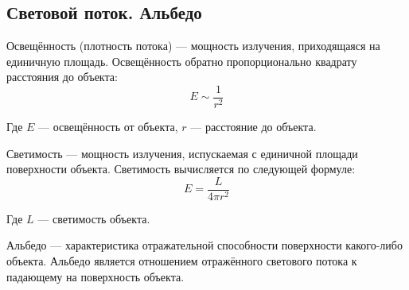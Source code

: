 \subsection{Световой поток. Альбедо}
Освещённость (плотность потока) --- мощность излучения, приходящаяся на единичную площадь. Освещённость обратно пропорционально квадрату расстояния до объекта:
\begin{equation}
E\sim \frac{1}{r^2}
\end{equation}

Где $E$ --- освещённость от объекта, $r$ --- расстояние до объекта.

Светимость --- мощность излучения, испускаемая с единичной площади поверхности объекта. Светимость вычисляется по следующей формуле:
\begin{equation}
E=\frac{L}{4\pi r^2}
\end{equation}

Где $L$ --- светимость объекта.

Альбедо --- характеристика отражательной способности поверхности какого-либо объекта. Альбедо является отношением отражённого светового потока к падающему на поверхность объекта.
